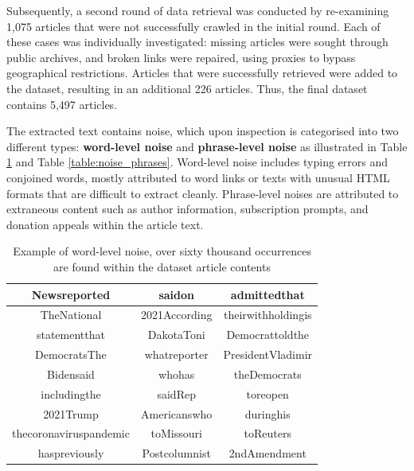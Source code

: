 Subsequently, a second round of data retrieval was conducted by re-examining 1,075 articles that were not successfully crawled in the initial round. Each of these cases was individually investigated: missing articles were sought through public archives, and broken links were repaired, using proxies to bypass geographical restrictions. Articles that were successfully retrieved were added to the dataset, resulting in an additional 226 articles. Thus, the final dataset contains 5,497 articles.

The extracted text contains noise, which upon inspection is categorised into two different types: \textbf{word-level noise} and \textbf{phrase-level noise} as illustrated in Table \ref{table:conjoined_words} and Table \ref{table:noise_phrases}. Word-level noise includes typing errors and conjoined words, mostly attributed to word links or texts with unusual HTML formats that are difficult to extract cleanly. Phrase-level noises are attributed to extraneous content such as author information, subscription prompts, and donation appeals within the article text.

\begin{table}[htbp]
    \centering
    \small
    \begin{tabular}{| c | c | c |}
        \hline
        Newsreported           & saidon        & admittedthat       \\
        \hline
        TheNational            & 2021According & theirwithholdingis \\
        \hline
        statementthat          & DakotaToni    & Democrattoldthe    \\
        \hline
        DemocratsThe           & whatreporter  & PresidentVladimir  \\
        \hline
        Bidensaid              & whohas        & theDemocrats       \\
        \hline
        includingthe           & saidRep       & toreopen           \\
        \hline
        2021Trump              & Americanswho  & duringhis          \\
        \hline
        thecoronaviruspandemic & toMissouri    & toReuters          \\
        \hline
        haspreviously          & Postcolumnist & 2ndAmendment       \\
        \hline
    \end{tabular}
    \caption{Example of word-level noise, over sixty thousand occurrences are found within the dataset article contents}
    \label{table:conjoined_words}
\end{table}

